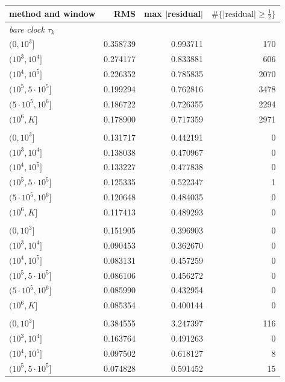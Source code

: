 \documentclass[11pt,reqno]{amsart}
\numberwithin{equation}{section}
\theoremstyle{plain}
\theoremstyle{definition}
\theoremstyle{remark}
\begin{document}
\begin{table}[htbp]
\centering
\small
\begin{tabular}{lrrr}
\toprule
method and window & RMS & max $|$residual$|$ & $\#\{|\text{residual}|\ge\frac12\}$\\
\midrule
\multicolumn{4}{l}{\textit{bare clock $\tau_k$}}\\
\quad $(0,10^3]$ & 0.358739 & 0.993711 & 170\\
\quad $(10^3,10^4]$ & 0.274177 & 0.833881 & 606\\
\quad $(10^4,10^5]$ & 0.226352 & 0.785835 & 2070\\
\quad $(10^5,5\cdot10^5]$ & 0.199294 & 0.762816 & 3478\\
\quad $(5\cdot10^5,10^6]$ & 0.186722 & 0.726355 & 2294\\
\quad $(10^6,K]$ & 0.178900 & 0.717359 & 2971\\
\addlinespace
\multicolumn{4}{l}{\textit{$P=\{2,3,5,7\}$, $B=0.6$}}\\
\quad $(0,10^3]$ & 0.131717 & 0.442191 & 0\\
\quad $(10^3,10^4]$ & 0.138038 & 0.470967 & 0\\
\quad $(10^4,10^5]$ & 0.133227 & 0.477838 & 0\\
\quad $(10^5,5\cdot10^5]$ & 0.125335 & 0.522347 & 1\\
\quad $(5\cdot10^5,10^6]$ & 0.120648 & 0.484035 & 0\\
\quad $(10^6,K]$ & 0.117413 & 0.489293 & 0\\
\addlinespace
\multicolumn{4}{l}{\textit{$P=\{p\le 61\}$, $B=0.6$}}\\
\quad $(0,10^3]$ & 0.151905 & 0.396903 & 0\\
\quad $(10^3,10^4]$ & 0.090453 & 0.362670 & 0\\
\quad $(10^4,10^5]$ & 0.083131 & 0.457259 & 0\\
\quad $(10^5,5\cdot10^5]$ & 0.086106 & 0.456272 & 0\\
\quad $(5\cdot10^5,10^6]$ & 0.085990 & 0.432954 & 0\\
\quad $(10^6,K]$ & 0.085354 & 0.400144 & 0\\
\addlinespace
\multicolumn{4}{l}{\textit{$P=\{p\le 1999\}$, no saturation}}\\
\quad $(0,10^3]$ & 0.384555 & 3.247397 & 116\\
\quad $(10^3,10^4]$ & 0.163764 & 0.491263 & 0\\
\quad $(10^4,10^5]$ & 0.097502 & 0.618127 & 8\\
\quad $(10^5,5\cdot10^5]$ & 0.074828 & 0.591452 & 15\\

\end{tabular}
\end{table}
\end{document}
